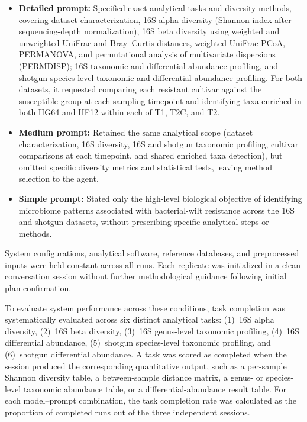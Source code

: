 \documentclass[10pt,letterpaper]{article}
\begin{document}
\begin{itemize}
  \item \textbf{Detailed prompt:} Specified exact analytical tasks and
    diversity methods, covering dataset characterization, 16S alpha diversity
    (Shannon index after sequencing-depth normalization), 16S beta diversity
    using weighted and unweighted UniFrac and Bray--Curtis distances,
    weighted-UniFrac PCoA, PERMANOVA, and permutational analysis of
    multivariate dispersions (PERMDISP); 16S taxonomic and
    differential-abundance profiling, and shotgun species-level taxonomic and
    differential-abundance profiling.  For both datasets, it requested
    comparing each resistant cultivar against the susceptible group at each
    sampling timepoint and identifying taxa enriched in both HG64 and HF12
    within each of T1, T2C, and T2.
  \item \textbf{Medium prompt:} Retained the same analytical scope (dataset
    characterization, 16S diversity, 16S and shotgun taxonomic profiling,
    cultivar comparisons at each timepoint, and shared enriched taxa
    detection), but omitted specific diversity metrics and statistical tests,
    leaving method selection to the agent.
  \item \textbf{Simple prompt:} Stated only the high-level biological
    objective of identifying microbiome patterns associated with
    bacterial-wilt resistance across the 16S and shotgun datasets, without
    prescribing specific analytical steps or methods.
\end{itemize}

System configurations, analytical software, reference databases, and
preprocessed inputs were held constant across all runs. Each replicate was
initialized in a clean conversation session without further methodological
guidance following initial plan confirmation.

To evaluate system performance across these conditions, task completion was
systematically evaluated across six distinct analytical tasks: (1)~16S alpha
diversity, (2)~16S beta diversity, (3)~16S genus-level taxonomic profiling,
(4)~16S differential abundance, (5)~shotgun species-level taxonomic
profiling, and (6)~shotgun differential abundance.  A task was scored as
completed when the session produced the corresponding quantitative output,
such as a per-sample Shannon diversity table, a between-sample distance
matrix, a genus- or species-level taxonomic abundance table, or a
differential-abundance result table.  For each model--prompt combination, the
task completion rate was calculated as the proportion of completed runs out of
the three independent sessions.
\end{document}

